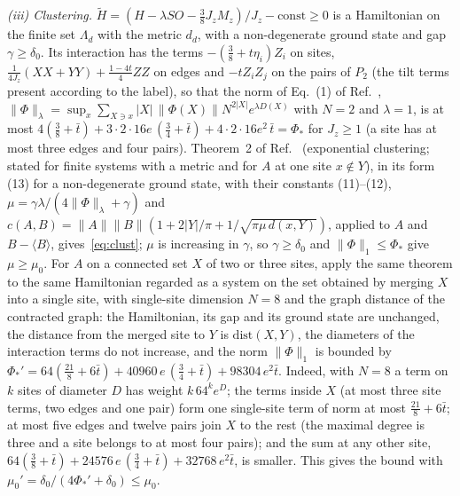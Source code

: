 \documentclass[aps,prx,onecolumn,10pt,nofootinbib,longbibliography,floatfix]{revtex4-2}
\theoremstyle{remark}
\newcommand{\Jz}{J_z}
\begin{document}
\emph{(iii) Clustering.} $\tilde H=(H-\lambda SO-\frac38\Jz M_z)/\Jz-\mathrm{const}\ge0$ is a Hamiltonian on the finite set
$\Lambda_d$ with the metric $d_d$, with a non-degenerate ground state and gap $\gamma\ge\delta_0$. Its interaction has
the terms $-(\frac38+t\eta_i)Z_i$ on sites, $\frac1{4\Jz}(XX+YY)+\frac{1-4t}{4}ZZ$ on edges and $-tZ_iZ_j$ on the
pairs of $P_2$ (the tilt terms present according to the label), so that the norm of Eq.~(1) of %
Ref.~\cite{nachtergaele2006}, $\|\Phi\|_\lambda=\sup_x\sum_{X\ni x}|X|\,\|\Phi(X)\|N^{2|X|}e^{\lambda D(X)}$ with $N=2$
and $\lambda=1$, is at most $4(\frac38+\bar t)+3\cdot2\cdot16e\,(\frac34+\bar t)+4\cdot2\cdot16e^2\,\bar t=\Phi_*$ for
$\Jz\ge1$ (a site has at most three edges and four pairs). Theorem~2 of Ref.~\cite{nachtergaele2006} (exponential %
clustering; stated for finite systems with a metric and for $A$ at one site $x\notin Y$), in its form (13) for a %
non-degenerate ground state, with their constants (11)--(12), $\mu=\gamma\lambda/(4\|\Phi\|_\lambda+\gamma)$ and %
$c(A,B)=\|A\|\|B\|(1+2|Y|/\pi+1/\sqrt{\pi\mu\,d(x,Y)})$, applied to $A$ and $B-\langle B\rangle$, gives~\eqref{eq:clust};
$\mu$ is increasing in $\gamma$, so $\gamma\ge\delta_0$ and $\|\Phi\|_1\le\Phi_*$ give $\mu\ge\mu_0$. For $A$ on a
connected set $X$ of two or three sites, apply the same theorem to the same Hamiltonian regarded as a system on the
set obtained by merging $X$ into a single site, with single-site dimension $N=8$ and the graph distance of the
contracted graph: the Hamiltonian, its gap and its ground state are unchanged, the distance from the merged site to
$Y$ is $\mathrm{dist}(X,Y)$, the diameters of the interaction terms do not increase, and the norm $\|\Phi\|_1$ is
bounded by $\Phi_*'=64(\frac{21}{8}+6\bar t)+40960\,e\,(\frac34+\bar t)+98304\,e^2\bar t$. Indeed, with $N=8$ a term on $k$ %
sites of diameter $D$ has weight $k\,64^ke^{D}$; the terms inside $X$ (at most three site terms, two edges and one %
pair) form one single-site term of norm at most $\frac{21}{8}+6\bar t$; at most five edges and twelve pairs join $X$ to %
the rest (the maximal degree is three and a site belongs to at most four pairs); and the sum at any other site,
$64(\frac38+\bar t)+24576\,e\,(\frac34+\bar t)+32768\,e^2\bar t$, is smaller. This gives the bound with %
$\mu_0'=\delta_0/(4\Phi_*'+\delta_0)\le\mu_0$.
\end{document}
